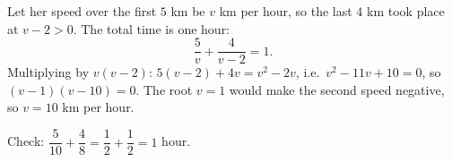 Let her speed over the first $5$ km be $v$ km per hour, so the last $4$ km took place at $v-2>0$. The total time is one hour:
\[
\dfrac{5}{v}+\dfrac{4}{v-2}=1 .
\]
Multiplying by $v(v-2)$: $5(v-2)+4v=v^2-2v$, i.e.\ $v^2-11v+10=0$, so $(v-1)(v-10)=0$. The root $v=1$ would make the second speed negative, so $v=\boxed{10}$ km per hour.

Check: $\dfrac{5}{10}+\dfrac{4}{8}=\dfrac{1}{2}+\dfrac{1}{2}=1$ hour.
